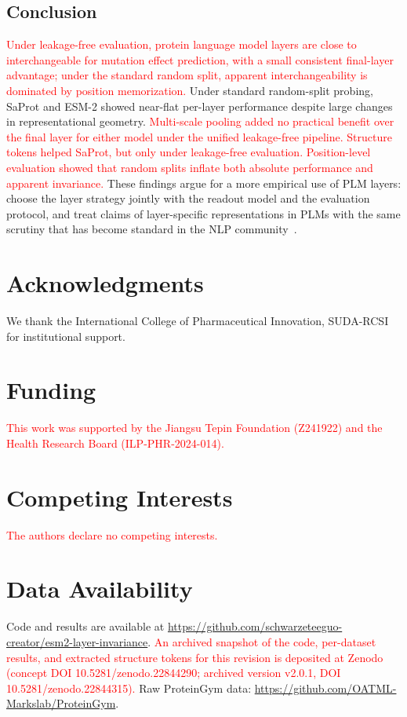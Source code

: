 \documentclass[11pt,a4paper]{article}
\newcommand{\revised}[1]{\textcolor{red}{#1}}
\begin{document}
\subsection{Conclusion}

\revised{Under leakage-free evaluation, protein language model layers are close to
interchangeable for mutation effect prediction, with a small consistent final-layer
advantage; under the standard random split, apparent interchangeability is dominated
by position memorization.} Under standard random-split probing,
SaProt and ESM-2 showed near-flat per-layer performance despite large changes in
representational geometry. \revised{Multi-scale pooling added no practical benefit
over the final layer for either model under the unified leakage-free pipeline.
Structure tokens helped SaProt, but only under leakage-free evaluation.
Position-level evaluation showed that random splits inflate both absolute
performance and apparent invariance.} These findings argue for a more empirical use
of PLM layers: choose the layer strategy jointly with the readout model and the
evaluation protocol, and treat claims of layer-specific representations in PLMs with
the same scrutiny that has become standard in the NLP community~\cite{rogers2021bertology}.

\section*{Acknowledgments}
We thank the International
College of Pharmaceutical Innovation, SUDA-RCSI for institutional support.

\section*{Funding}
\revised{This work was supported by the Jiangsu Tepin Foundation (Z241922) and
the Health Research Board (ILP-PHR-2024-014).}

\section*{Competing Interests}
\revised{The authors declare no competing interests.}

\section*{Data Availability}
Code and results are available at \url{https://github.com/schwarzeteeguo-creator/esm2-layer-invariance}.
\revised{An archived snapshot of the code, per-dataset results, and extracted
structure tokens for this revision is deposited at Zenodo (concept DOI
10.5281/zenodo.22844290; archived version v2.0.1, DOI 10.5281/zenodo.22844315).}
Raw ProteinGym data: \url{https://github.com/OATML-Markslab/ProteinGym}.
\end{document}
